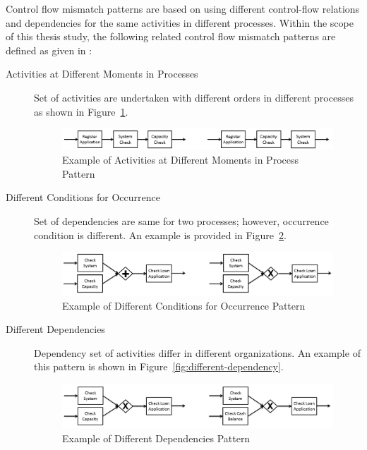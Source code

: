 Control flow mismatch patterns are based on using different control-flow relations and dependencies for the same activities in different processes. Within the scope of this thesis study, the following related control flow mismatch patterns are defined as given in \cite{dijkman2007mismatch}:
\begin{description}
  \item[Activities at Different Moments in Processes] Set of activities are undertaken with different orders in different processes as shown in Figure~\ref{fig:different-moments}. 
      \begin{figure}
      \centering
      \includegraphics[width=\textwidth]{3_background/mismatch-patterns-different-moments}
      \caption{Example of Activities at Different Moments in Process Pattern}
      \label{fig:different-moments}
      \end{figure}
  \item[Different Conditions for Occurrence] Set of dependencies are same for two processes; however, occurrence condition is different. An example is provided in Figure~\ref{fig:different-conditions}.
      \begin{figure}
      \centering
      \includegraphics[width=\textwidth]{3_background/mismatch-patterns-different-conditions}
      \caption{Example of Different Conditions for Occurrence Pattern}
      \label{fig:different-conditions}
      \end{figure}
  \item[Different Dependencies] Dependency set of activities differ in different organizations. An example of this pattern is shown in Figure~\ref{fig:different-dependency}.
      \begin{figure}
      \centering
      \includegraphics[width=\textwidth]{3_background/mismatch-patterns-different-dependency}
      \caption{Example of Different Dependencies Pattern}

\end{figure}
\end{description}

